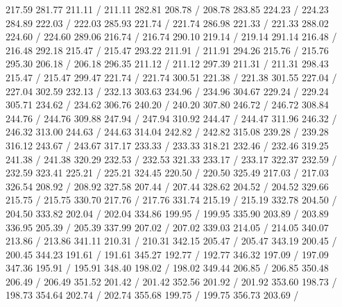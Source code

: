 { 217.59 281.77 211.11 /
 211.11 282.81 208.78 /
 208.78 283.85 224.23 /
 224.23 284.89 222.03 /
 222.03 285.93 221.74 /
 221.74 286.98 221.33 /
 221.33 288.02 224.60 /
 224.60 289.06 216.74 /
 216.74 290.10 219.14 /
 219.14 291.14 216.48 /
 216.48 292.18 215.47 /
 215.47 293.22 211.91 /
 211.91 294.26 215.76 /
 215.76 295.30 206.18 /
 206.18 296.35 211.12 /
 211.12 297.39 211.31 /
 211.31 298.43 215.47 /
 215.47 299.47 221.74 /
 221.74 300.51 221.38 /
 221.38 301.55 227.04 /
 227.04 302.59 232.13 /
 232.13 303.63 234.96 /
 234.96 304.67 229.24 /
 229.24 305.71 234.62 /
 234.62 306.76 240.20 /
 240.20 307.80 246.72 /
 246.72 308.84 244.76 /
 244.76 309.88 247.94 /
 247.94 310.92 244.47 /
 244.47 311.96 246.32 /
 246.32 313.00 244.63 /
 244.63 314.04 242.82 /
 242.82 315.08 239.28 /
 239.28 316.12 243.67 /
 243.67 317.17 233.33 /
 233.33 318.21 232.46 /
 232.46 319.25 241.38 /
 241.38 320.29 232.53 /
 232.53 321.33 233.17 /
 233.17 322.37 232.59 /
 232.59 323.41 225.21 /
 225.21 324.45 220.50 /
 220.50 325.49 217.03 /
 217.03 326.54 208.92 /
 208.92 327.58 207.44 /
 207.44 328.62 204.52 /
 204.52 329.66 215.75 /
 215.75 330.70 217.76 /
 217.76 331.74 215.19 /
 215.19 332.78 204.50 /
 204.50 333.82 202.04 /
 202.04 334.86 199.95 /
 199.95 335.90 203.89 /
 203.89 336.95 205.39 /
 205.39 337.99 207.02 /
 207.02 339.03 214.05 /
 214.05 340.07 213.86 /
 213.86 341.11 210.31 /
 210.31 342.15 205.47 /
 205.47 343.19 200.45 /
 200.45 344.23 191.61 /
 191.61 345.27 192.77 /
 192.77 346.32 197.09 /
 197.09 347.36 195.91 /
 195.91 348.40 198.02 /
 198.02 349.44 206.85 /
 206.85 350.48 206.49 /
 206.49 351.52 201.42 /
 201.42 352.56 201.92 /
 201.92 353.60 198.73 /
 198.73 354.64 202.74 /
 202.74 355.68 199.75 /
 199.75 356.73 203.69 /
}
